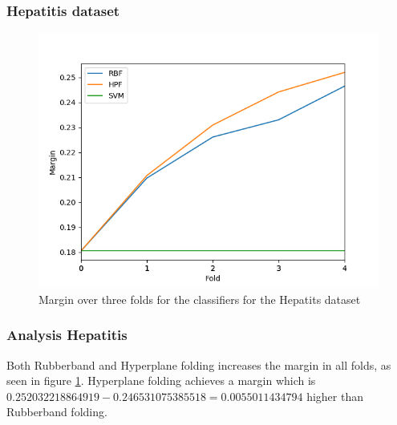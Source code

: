 \documentclass[a4paper,twoside]{bth}
\begin{document}
\subsubsection{Hepatitis dataset}
\begin{figure}[!htb]
\centering
\includegraphics[scale=0.7]{images/result-hep/Margin.png}
   \caption{Margin over three folds for the classifiers for the Hepatits dataset}
   \label{fig:hep-margin}
\end{figure}

\FloatBarrier

\subsubsection{Analysis Hepatitis}
Both Rubberband and Hyperplane folding increases the margin in all folds, as seen in figure \ref{fig:hep-margin}. Hyperplane folding achieves a margin which is $0.252032218864919 - 0.246531075385518 = 0.0055011434794$ higher than Rubberband folding.


\clearpage
\FloatBarrier
\end{document}
